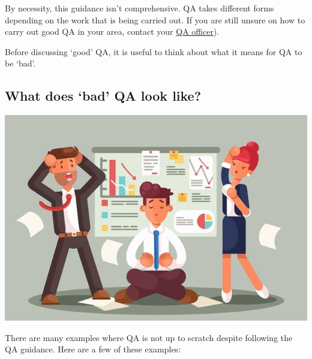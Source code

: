 \documentclass[
]{article}
\begin{document}
By necessity, this guidance isn't comprehensive. QA takes different forms depending on the work that is being carried out. If you are still unsure on how to carry out good QA in your area, contact your \href{https://educationgovuk.sharepoint.com/sites/sarpi/g/SitePages/QA-Officers'N.aspx}{QA officer}).

Before discussing `good' QA, it is useful to think about what it means for QA to be `bad'.

\hypertarget{what-does-bad-qa-look-like}{%
\subsection{What does `bad' QA look like?}\label{what-does-bad-qa-look-like}}

\includegraphics{pictures/bad_qa_pic.jpg}

There are many examples where QA is not up to scratch despite following the QA guidance. Here are a few of these examples:
\end{document}
